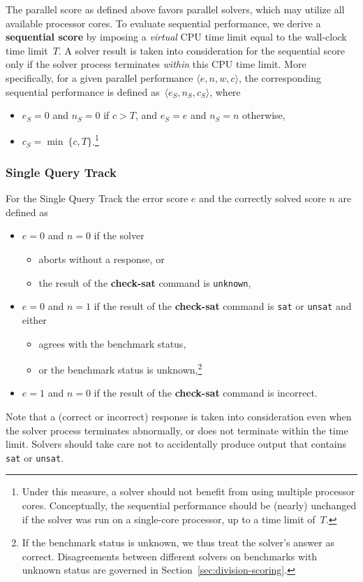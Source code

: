 \documentclass[12pt]{article}
\newcommand{\akey}[1]{\textbf{#1}\xspace}
\newcommand{\maintrack}{Single Query Track\xspace}
\newcommand{\challtrack}{Industry-Challenge Track\xspace}
\begin{document}
The parallel score as defined above favors parallel solvers, which may utilize
all available processor cores.  To evaluate sequential performance, we derive a
\textbf{sequential score} by imposing a \emph{virtual} CPU time limit equal to
the wall-clock time limit~$T$.  A solver result is taken into consideration for
the sequential score only if the solver process terminates \emph{within} this
CPU time limit.  More specifically, for a given parallel performance $\langle
e, n, w, c\rangle$, the corresponding sequential performance is defined
as~$\langle e_S, n_S, c_S\rangle$, where
\begin{itemize}
\item $e_S = 0$ and $n_S = 0$ if $c > T$, and $e_S = e$ and $n_S = n$
  otherwise,
\item $c_S = \min\ \{c, T\}$.\footnote{Under this
  measure, a solver should not benefit from using multiple processor
  cores.  Conceptually, the sequential performance should be (nearly)
  unchanged if the solver was run on a single-core processor, up to a
  time limit of~$T$.}
\end{itemize}

\subsubsection{\maintrack}%
  For the \maintrack the error score $e$ and the correctly
  solved score $n$ are defined as
  \begin{itemize}
  \item $e=0$ and $n=0$ if the solver
    \begin{itemize}[noitemsep,nolistsep]
      \item aborts without a response, or
      \item  the result of the \akey{check-sat} command is \texttt{unknown},
    \end{itemize}
  \item $e=0$ and $n=1$ if the result of the \akey{check-sat} command is
      \texttt{sat} or \texttt{unsat} and either
    \begin{itemize}[noitemsep,nolistsep]
      \item agrees with the benchmark status,
      \item or the benchmark status
        is unknown,\footnote{If the benchmark status is unknown, we thus treat
        the solver's answer as correct.  Disagreements between different
        solvers on benchmarks with unknown status are governed in
        Section~\ref{sec:division-scoring}.}
    \end{itemize}
  \item $e=1$ and $n=0$ if the result of the \akey{check-sat} command is
    incorrect.
  \end{itemize}
%
Note that a (correct or incorrect) response is taken into
consideration even when the solver process terminates abnormally, or
does not terminate within the time limit.  Solvers should take care
not to accidentally produce output that contains \texttt{sat} or
\texttt{unsat}.
\end{document}
